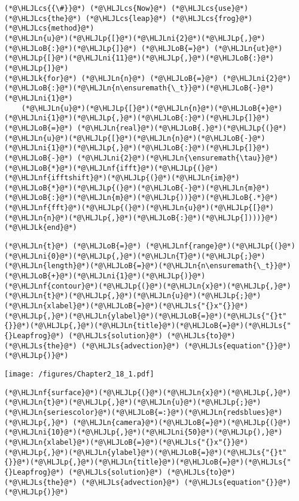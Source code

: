 \documentclass[12pt,a4paper]{article}
\newcommand{\HLJLk}[1]{\textcolor[RGB]{148,91,176}{\textbf{#1}}}
\newcommand{\HLJLn}[1]{#1}
\newcommand{\HLJLnf}[1]{\textcolor[RGB]{66,102,213}{#1}}
\newcommand{\HLJLs}[1]{\textcolor[RGB]{201,61,57}{#1}}
\newcommand{\HLJLni}[1]{\textcolor[RGB]{59,151,46}{#1}}
\newcommand{\HLJLoB}[1]{\textcolor[RGB]{102,102,102}{\textbf{#1}}}
\newcommand{\HLJLp}[1]{#1}
\newcommand{\HLJLcs}[1]{\textcolor[RGB]{153,153,119}{\textit{#1}}}
\begin{document}
\begin{lstlisting}
(*@\HLJLcs{{\#}}@*) (*@\HLJLcs{Now}@*) (*@\HLJLcs{use}@*) (*@\HLJLcs{the}@*) (*@\HLJLcs{leap}@*) (*@\HLJLcs{frog}@*) (*@\HLJLcs{method}@*)
(*@\HLJLn{u}@*)(*@\HLJLp{[}@*)(*@\HLJLni{2}@*)(*@\HLJLp{,}@*)(*@\HLJLoB{:}@*)(*@\HLJLp{]}@*) (*@\HLJLoB{=}@*) (*@\HLJLn{ut}@*)(*@\HLJLp{[}@*)(*@\HLJLni{11}@*)(*@\HLJLp{,}@*)(*@\HLJLoB{:}@*)(*@\HLJLp{]}@*)
(*@\HLJLk{for}@*) (*@\HLJLn{n}@*) (*@\HLJLoB{=}@*) (*@\HLJLni{2}@*)(*@\HLJLoB{:}@*)(*@\HLJLn{n\ensuremath{\_t}}@*)(*@\HLJLoB{-}@*)(*@\HLJLni{1}@*)
    (*@\HLJLn{u}@*)(*@\HLJLp{[}@*)(*@\HLJLn{n}@*)(*@\HLJLoB{+}@*)(*@\HLJLni{1}@*)(*@\HLJLp{,}@*)(*@\HLJLoB{:}@*)(*@\HLJLp{]}@*) (*@\HLJLoB{=}@*) (*@\HLJLn{real}@*)(*@\HLJLoB{.}@*)(*@\HLJLp{(}@*)(*@\HLJLn{u}@*)(*@\HLJLp{[}@*)(*@\HLJLn{n}@*)(*@\HLJLoB{-}@*)(*@\HLJLni{1}@*)(*@\HLJLp{,}@*)(*@\HLJLoB{:}@*)(*@\HLJLp{]}@*) (*@\HLJLoB{-}@*) (*@\HLJLni{2}@*)(*@\HLJLn{\ensuremath{\tau}}@*)(*@\HLJLoB{*}@*)(*@\HLJLnf{ifft}@*)(*@\HLJLp{(}@*)(*@\HLJLnf{ifftshift}@*)(*@\HLJLp{(}@*)(*@\HLJLn{im}@*)(*@\HLJLoB{*}@*)(*@\HLJLp{(}@*)(*@\HLJLoB{-}@*)(*@\HLJLn{m}@*)(*@\HLJLoB{:}@*)(*@\HLJLn{m}@*)(*@\HLJLp{))}@*)(*@\HLJLoB{.*}@*)(*@\HLJLnf{fft}@*)(*@\HLJLp{(}@*)(*@\HLJLn{u}@*)(*@\HLJLp{[}@*)(*@\HLJLn{n}@*)(*@\HLJLp{,}@*)(*@\HLJLoB{:}@*)(*@\HLJLp{])))}@*)
(*@\HLJLk{end}@*)
\end{lstlisting}


\begin{lstlisting}
(*@\HLJLn{t}@*) (*@\HLJLoB{=}@*) (*@\HLJLnf{range}@*)(*@\HLJLp{(}@*)(*@\HLJLni{0}@*)(*@\HLJLp{,}@*)(*@\HLJLn{T}@*)(*@\HLJLp{;}@*)(*@\HLJLn{length}@*)(*@\HLJLoB{=}@*)(*@\HLJLn{n\ensuremath{\_t}}@*)(*@\HLJLoB{+}@*)(*@\HLJLni{1}@*)(*@\HLJLp{)}@*)
(*@\HLJLnf{contour}@*)(*@\HLJLp{(}@*)(*@\HLJLn{x}@*)(*@\HLJLp{,}@*)(*@\HLJLn{t}@*)(*@\HLJLp{,}@*)(*@\HLJLn{u}@*)(*@\HLJLp{;}@*)(*@\HLJLn{xlabel}@*)(*@\HLJLoB{=}@*)(*@\HLJLs{"{}x"{}}@*)(*@\HLJLp{,}@*)(*@\HLJLn{ylabel}@*)(*@\HLJLoB{=}@*)(*@\HLJLs{"{}t"{}}@*)(*@\HLJLp{,}@*)(*@\HLJLn{title}@*)(*@\HLJLoB{=}@*)(*@\HLJLs{"{}Leapfrog}@*) (*@\HLJLs{solution}@*) (*@\HLJLs{to}@*) (*@\HLJLs{the}@*) (*@\HLJLs{advection}@*) (*@\HLJLs{equation"{}}@*)(*@\HLJLp{)}@*)
\end{lstlisting}

\texttt{[image: /figures/Chapter2\_18\_1.pdf]}

\begin{lstlisting}
(*@\HLJLnf{surface}@*)(*@\HLJLp{(}@*)(*@\HLJLn{x}@*)(*@\HLJLp{,}@*)(*@\HLJLn{t}@*)(*@\HLJLp{,}@*)(*@\HLJLn{u}@*)(*@\HLJLp{;}@*)(*@\HLJLn{seriescolor}@*)(*@\HLJLoB{=:}@*)(*@\HLJLn{redsblues}@*)(*@\HLJLp{,}@*) (*@\HLJLn{camera}@*)(*@\HLJLoB{=}@*)(*@\HLJLp{(}@*)(*@\HLJLni{10}@*)(*@\HLJLp{,}@*)(*@\HLJLni{50}@*)(*@\HLJLp{),}@*)
(*@\HLJLn{xlabel}@*)(*@\HLJLoB{=}@*)(*@\HLJLs{"{}x"{}}@*)(*@\HLJLp{,}@*)(*@\HLJLn{ylabel}@*)(*@\HLJLoB{=}@*)(*@\HLJLs{"{}t"{}}@*)(*@\HLJLp{,}@*)(*@\HLJLn{title}@*)(*@\HLJLoB{=}@*)(*@\HLJLs{"{}Leapfrog}@*) (*@\HLJLs{solution}@*) (*@\HLJLs{to}@*) (*@\HLJLs{the}@*) (*@\HLJLs{advection}@*) (*@\HLJLs{equation"{}}@*)(*@\HLJLp{)}@*)
\end{lstlisting}
\end{document}

